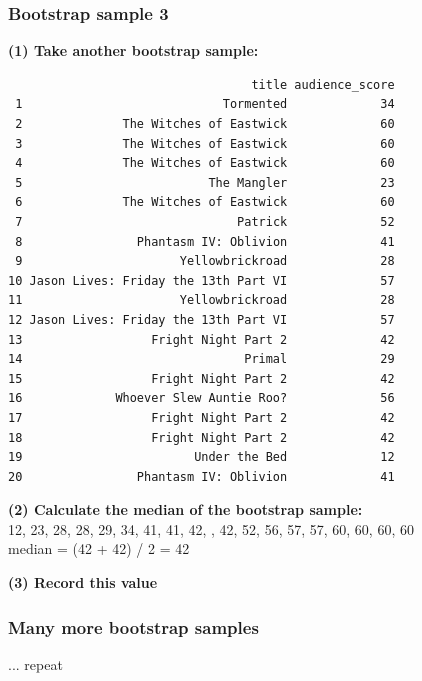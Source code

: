 \documentclass[11pt,containsverbatim,handout,xcolor=xelatex,dvipsnames,table]{beamer}
\begin{document}
\begin{frame}[fragile]
\frametitle{Bootstrap sample 3}

{\small \textbf{(1) Take another bootstrap sample:}}
\pause
{\tiny
\begin{verbatim}
                                  title audience_score
 1                            Tormented             34
 2              The Witches of Eastwick             60
 3              The Witches of Eastwick             60
 4              The Witches of Eastwick             60
 5                          The Mangler             23
 6              The Witches of Eastwick             60
 7                              Patrick             52
 8                Phantasm IV: Oblivion             41
 9                      Yellowbrickroad             28
10 Jason Lives: Friday the 13th Part VI             57
11                      Yellowbrickroad             28
12 Jason Lives: Friday the 13th Part VI             57
13                  Fright Night Part 2             42
14                               Primal             29
15                  Fright Night Part 2             42
16             Whoever Slew Auntie Roo?             56
17                  Fright Night Part 2             42
18                  Fright Night Part 2             42
19                        Under the Bed             12
20                Phantasm IV: Oblivion             41
\end{verbatim}
}

\pause

{\small \textbf{(2) Calculate the median of the bootstrap sample:}} \\
\pause
{\footnotesize
12, 23, 28, 28, 29, 34, 41, 41, 42, , 42, 52, 56, 57, 57, 60, 60, 60, 60 \\
median = (42 + 42) / 2 = 42 \\
}

\pause

{\small
\textbf{(3) Record this value}
}

\end{frame}


\begin{frame}
\frametitle{Many more bootstrap samples}

\vfill

... repeat

\vfill

\end{frame}
\end{document}
